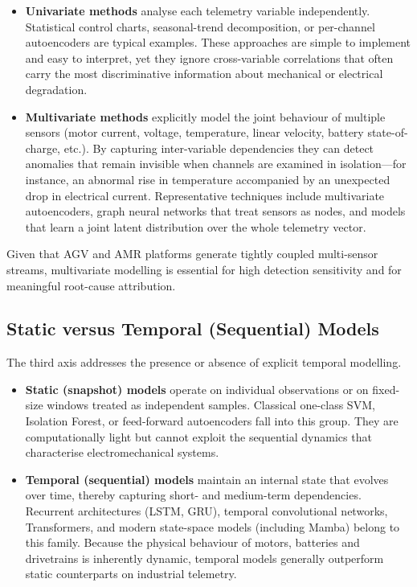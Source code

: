 \begin{itemize}
    \item \textbf{Univariate methods} analyse each telemetry variable independently.
    Statistical control charts, seasonal-trend decomposition, or per-channel autoencoders are typical examples.
    These approaches are simple to implement and easy to interpret, yet they ignore cross-variable correlations that often carry the most discriminative information about mechanical or electrical degradation.
    
    \item \textbf{Multivariate methods} explicitly model the joint behaviour of multiple sensors (motor current, voltage, temperature, linear velocity, battery state-of-charge, etc.).
    By capturing inter-variable dependencies they can detect anomalies that remain invisible when channels are examined in isolation—for instance, an abnormal rise in temperature accompanied by an unexpected drop in electrical current.
    Representative techniques include multivariate autoencoders, graph neural networks that treat sensors as nodes, and models that learn a joint latent distribution over the whole telemetry vector.
\end{itemize}

Given that AGV and AMR platforms generate tightly coupled multi-sensor streams, multivariate modelling is essential for high detection sensitivity and for meaningful root-cause attribution.

\subsection{Static versus Temporal (Sequential) Models}

The third axis addresses the presence or absence of explicit temporal modelling.

\begin{itemize}
    \item \textbf{Static (snapshot) models} operate on individual observations or on fixed-size windows treated as independent samples.
    Classical one-class SVM, Isolation Forest, or feed-forward autoencoders fall into this group.
    They are computationally light but cannot exploit the sequential dynamics that characterise electromechanical systems.
    
    \item \textbf{Temporal (sequential) models} maintain an internal state that evolves over time, thereby capturing short- and medium-term dependencies.
    Recurrent architectures (LSTM, GRU), temporal convolutional networks, Transformers, and modern state-space models (including Mamba) belong to this family.
    Because the physical behaviour of motors, batteries and drivetrains is inherently dynamic, temporal models generally outperform static counterparts on industrial telemetry.
\end{itemize}

